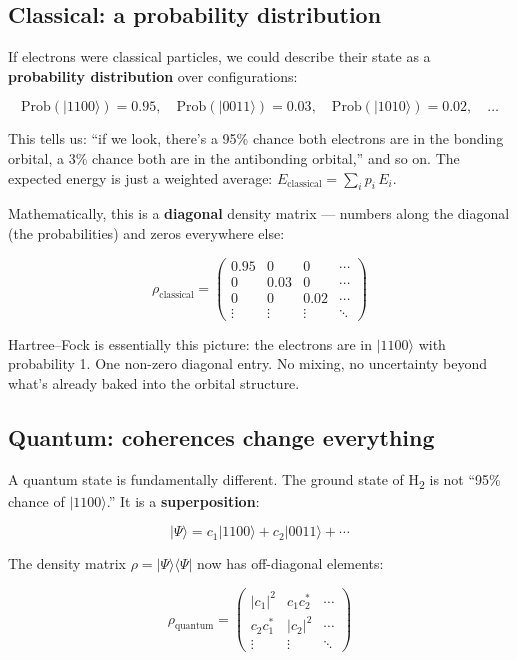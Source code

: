 \documentclass[
  11pt,
  oneside]{book}
\begin{document}
\subsection{Classical: a probability
distribution}\label{classical-a-probability-distribution}

If electrons were classical particles, we could describe their state as
a \textbf{probability distribution} over configurations:

\[\text{Prob}(\lvert 1100\rangle) = 0.95, \quad \text{Prob}(\lvert 0011\rangle) = 0.03, \quad \text{Prob}(\lvert 1010\rangle) = 0.02, \quad \ldots\]

This tells us: ``if we look, there's a 95\% chance both electrons are in
the bonding orbital, a 3\% chance both are in the antibonding orbital,''
and so on. The expected energy is just a weighted average:
\(E_{\text{classical}} = \sum_i p_i \, E_i\).

Mathematically, this is a \textbf{diagonal} density matrix --- numbers
along the diagonal (the probabilities) and zeros everywhere else:

\[\rho_{\text{classical}} = \begin{pmatrix}
0.95 & 0 & 0 & \cdots \\
0 & 0.03 & 0 & \cdots \\
0 & 0 & 0.02 & \cdots \\
\vdots & \vdots & \vdots & \ddots
\end{pmatrix}\]

Hartree--Fock is essentially this picture: the electrons are in
\(\lvert 1100\rangle\) with probability 1. One non-zero diagonal entry.
No mixing, no uncertainty beyond what's already baked into the orbital
structure.

\subsection{Quantum: coherences change
everything}\label{quantum-coherences-change-everything}

A quantum state is fundamentally different. The ground state of H\textsubscript{2} is
not ``95\% chance of \(\lvert 1100\rangle\).'' It is a
\textbf{superposition}:

\[\lvert\Psi\rangle = c_1\lvert 1100\rangle + c_2\lvert 0011\rangle + \cdots\]

The density matrix \(\rho = \lvert\Psi\rangle\langle\Psi\rvert\) now has
off-diagonal elements:

\[\rho_{\text{quantum}} = \begin{pmatrix}
\lvert c_1\rvert^2 & c_1 c_2^* & \cdots \\
c_2 c_1^* & \lvert c_2\rvert^2 & \cdots \\
\vdots & \vdots & \ddots
\end{pmatrix}\]
\end{document}
